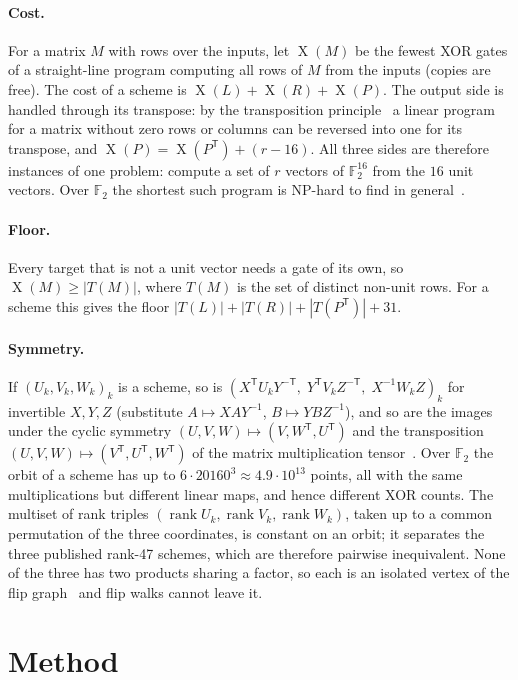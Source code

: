 \documentclass[11pt]{article}
\theoremstyle{remark}
\newcommand{\F}{\mathbb{F}}
\newcommand{\XOR}{\operatorname{X}}
\begin{document}
\paragraph{Cost.}  For a matrix $M$ with rows over the inputs, let
$\XOR(M)$ be the fewest XOR gates of a straight-line program computing
all rows of $M$ from the inputs (copies are free).  The cost of a scheme
is $\XOR(L)+\XOR(R)+\XOR(P)$.  The output side is handled through its
transpose: by the transposition principle~\cite{BCS97} a linear program
for a matrix without zero rows or columns can be reversed into one for
its transpose, and $\XOR(P)=\XOR(P^{\mathsf T})+(r-16)$.  All three
sides are therefore instances of one problem: compute a set of $r$
vectors of $\F_2^{16}$ from the $16$ unit vectors.  Over $\F_2$ the
shortest such program is NP-hard to find in general~\cite{BMP08}.

\paragraph{Floor.}  Every target that is not a unit vector needs a gate
of its own, so $\XOR(M)\ge|T(M)|$, where $T(M)$ is the set of distinct
non-unit rows.  For a scheme this gives the floor
$|T(L)|+|T(R)|+|T(P^{\mathsf T})|+31$.

\paragraph{Symmetry.}  If $(U_k,V_k,W_k)_k$ is a scheme, so is
$(X^{\mathsf T}U_kY^{-\mathsf T},\;Y^{\mathsf T}V_kZ^{-\mathsf T},\;
X^{-1}W_kZ)_k$ for invertible $X,Y,Z$ (substitute $A\mapsto XAY^{-1}$,
$B\mapsto YBZ^{-1}$), and so are the images under the cyclic symmetry
$(U,V,W)\mapsto(V,W^{\mathsf T},U^{\mathsf T})$ and the transposition
$(U,V,W)\mapsto(V^{\mathsf T},U^{\mathsf T},W^{\mathsf T})$ of the
matrix multiplication tensor~\cite{deGroote78}.  Over $\F_2$ the orbit
of a scheme has up to $6\cdot20160^3\approx4.9\cdot10^{13}$ points, all
with the same multiplications but different linear maps, and hence
different XOR counts.  The multiset of rank triples
$(\operatorname{rank}U_k,\operatorname{rank}V_k,\operatorname{rank}W_k)$,
taken up to a common permutation of the three coordinates, is constant
on an orbit; it separates the three published rank-47 schemes, which
are therefore pairwise inequivalent.  None of the three has two
products sharing a factor, so each is an isolated vertex of the flip
graph~\cite{KM23} and flip walks cannot leave it.

\section{Method}\label{sec:method}
\end{document}

